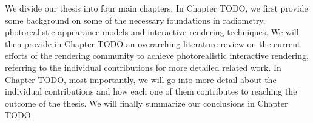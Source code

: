 We divide our thesis into four main chapters. In Chapter TODO, we first provide some background on some of the necessary foundations in radiometry, photorealistic appearance models and interactive rendering techniques. We will then provide in Chapter TODO an overarching literature review on the current efforts of the rendering community to achieve photorealistic interactive rendering, referring to the individual contributions for more detailed related work. In Chapter TODO, most importantly, we will go into more detail about the individual contributions and how each one of them contributes to reaching the outcome of the thesis. We will finally summarize our conclusions in Chapter TODO. 
